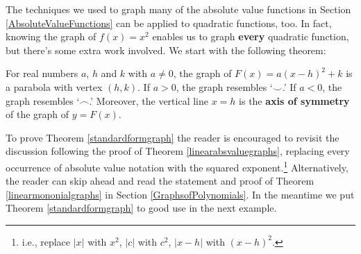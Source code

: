 The techniques we used to graph many of the absolute value functions in Section \ref{AbsoluteValueFunctions} can be applied to quadratic functions, too.  In fact, knowing the graph of $f(x) = x^2$ enables us to graph \textbf{every} quadratic function, but there's some extra work involved.  We start with the following theorem:

\medskip

\colorbox{ResultColor}{\bbm

\begin{thm}  \label{standardformgraph}  For real numbers $a$, $h$ and $k$ with $a\neq 0$, the graph of  $F(x) = a(x-h)^2 + k$ is a parabola with vertex $(h,k)$.  If $a>0$, the graph resembles  `$\smile$.'  If $a<0$, the graph resembles `$\frown$.'  Moreover, the vertical line $x=h$ is the  \textbf{axis of symmetry} of the graph of $y = F(x)$.
\end{thm}
\ebm}

\medskip

To prove Theorem \ref{standardformgraph} the reader is encouraged to revisit the discussion following the proof of Theorem \ref{linearabsvaluegraphs}, replacing every occurrence of absolute value notation with the squared exponent.\footnote{i.e., replace $|x|$ with $x^2$, $|c|$ with $c^2$, $|x-h|$ with $(x-h)^2$.} Alternatively, the reader can skip ahead and read the statement and proof of Theorem \ref{linearmononialgraphs} in Section \ref{GraphsofPolynomials}.  In the meantime we put Theorem \ref{standardformgraph}  to good use in the next example.

